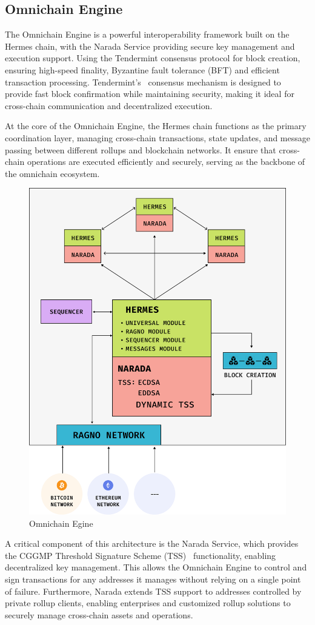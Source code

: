 \subsection{Omnichain Engine}

The Omnichain Engine is a powerful interoperability framework built on the Hermes chain, with the Narada Service providing secure key management and execution support. Using the Tendermint consensus protocol for block creation, ensuring high-speed finality, Byzantine fault tolerance (BFT) and efficient transaction processing. Tendermint’s~\cite{tendermint} consensus mechanism is designed to provide fast block confirmation while maintaining security, making it ideal for cross-chain communication and decentralized execution.

At the core of the Omnichain Engine, the Hermes chain functions as the primary coordination layer, managing cross-chain transactions, state updates, and message passing between different rollups and blockchain networks. It ensure that cross-chain operations are executed efficiently and securely, serving as the backbone of the omnichain ecosystem.

\begin{figure}[h]
    \centering
    \includegraphics[width=0.7\linewidth]{figure/engine.png}
    \caption{Omnichain Egine}
    \label{fig:engine}
\end{figure}

A critical component of this architecture is the Narada Service, which provides the CGGMP Threshold Signature Scheme (TSS)~\cite{tss} functionality, enabling decentralized key management. This allows the Omnichain Engine to control and sign transactions for any addresses it manages without relying on a single point of failure. Furthermore, Narada extends TSS support to addresses controlled by private rollup clients, enabling enterprises and customized rollup solutions to securely manage cross-chain assets and operations.

